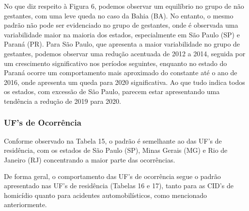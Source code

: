 \documentclass[
]{article}
\begin{document}
No que diz respeito à Figura 6, podemos observar um equilíbrio no grupo
de não gestantes, com uma leve queda no caso da Bahia (BA). No entanto,
o mesmo padrão não pode ser evidenciado no grupo de gestantes, onde é
observada uma variabilidade maior na maioria dos estados, especialmente
em São Paulo (SP) e Paraná (PR). Para São Paulo, que apresenta a maior
variabilidade no grupo de gestantes, podemos observar uma redução
acentuada de 2012 a 2014, seguida por um crescimento significativo nos
períodos seguintes, enquanto no estado do Paraná ocorre um comportamento
mais aproximado do constante até o ano de 2016, onde apresenta um queda
para 2020 significativa. Ao que tudo indica todos os estados, com
excessão de São Paulo, parecem estar apresentando uma tendência a
redução de 2019 para 2020.

\hypertarget{ufs-de-ocorruxeancia}{%
\subsubsection{UF's de Ocorrência}\label{ufs-de-ocorruxeancia}}

Conforme observado na Tabela 15, o padrão é semelhante ao das UF's de
residência, com os estados de São Paulo (SP), Minas Gerais (MG) e Rio de
Janeiro (RJ) concentrando a maior parte das ocorrências.

De forma geral, o comportamento das UF's de ocorrência segue o padrão
apresentado nas UF's de residência (Tabelas 16 e 17), tanto para as
CID's de homicídio quanto para acidentes automobilísticos, como
mencionado anteriormente.
\end{document}
